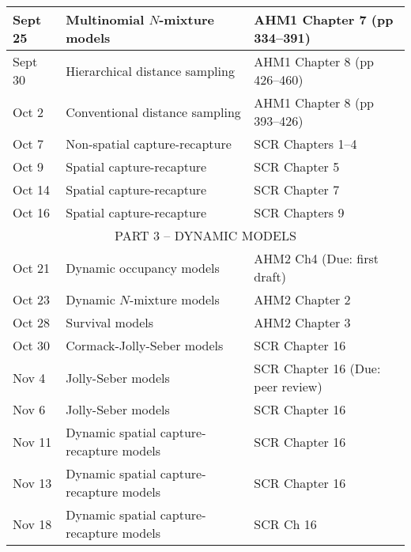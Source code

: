 \documentclass[12pt]{article}
\begin{document}
\begin{center}
\begin{tabular}[c]{lll}
Sept 25    & Multinomial $N$-mixture models               & AHM1 Chapter 7 (pp 334--391)                          \\
\hline
Sept 30      & Hierarchical distance sampling               & AHM1 Chapter 8 (pp 426--460)                          \\
Oct 2      & Conventional distance sampling               & AHM1 Chapter 8 (pp 393--426)                          \\
\hline
Oct 7     & Non-spatial capture-recapture                & SCR Chapters 1--4                                     \\
Oct 9     & Spatial capture-recapture                    & SCR Chapter 5                                         \\
\hline
Oct 14     & Spatial capture-recapture                    & SCR Chapter 7                                         \\
Oct 16     & Spatial capture-recapture                    & SCR Chapters 9                                        \\
\hline
           \multicolumn{3}{c}{PART 3 -- DYNAMIC MODELS}                                                           \\
\hline
Oct 21     & Dynamic occupancy models                     & AHM2 Ch4 (Due: first draft)                           \\
Oct 23     & Dynamic $N$-mixture models                   & AHM2 Chapter 2                                        \\
\hline
Oct 28     & Survival models                               & AHM2 Chapter 3                                        \\
Oct 30      & Cormack-Jolly-Seber models                   & SCR Chapter 16                                        \\
\hline
Nov 4      & Jolly-Seber models                           & SCR Chapter 16 (Due: peer review)                     \\
Nov 6      & Jolly-Seber models                           & SCR Chapter 16                                        \\
\hline
Nov 11     & Dynamic spatial capture-recapture models     & SCR Chapter 16                                        \\
Nov 13     & Dynamic spatial capture-recapture models     & SCR Chapter 16                                        \\
\hline
Nov 18     & Dynamic spatial capture-recapture models     & SCR Ch 16                                             \\

\end{tabular}
\end{center}
\end{document}
